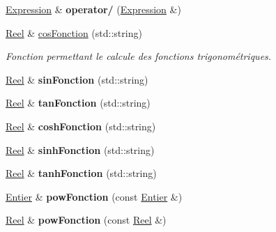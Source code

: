 \begin{DoxyCompactItemize}
\item 
\hypertarget{class_entier_a4ac1f3d23dbd05c895da17659ac32674}{\hyperlink{class_expression}{Expression} \& {\bfseries operator/} (\hyperlink{class_expression}{Expression} \&)}\label{class_entier_a4ac1f3d23dbd05c895da17659ac32674}

\item 
\hyperlink{class_reel}{Reel} \& \hyperlink{class_entier_af49382e55f1a6c4d35472937eb4e8493}{cos\-Fonction} (std\-::string)
\begin{DoxyCompactList}\small\item\em Fonction permettant le calcule des fonctions trigonométriques. \end{DoxyCompactList}\item 
\hypertarget{class_entier_a9a76bc95371915ab2597da36388784d0}{\hyperlink{class_reel}{Reel} \& {\bfseries sin\-Fonction} (std\-::string)}\label{class_entier_a9a76bc95371915ab2597da36388784d0}

\item 
\hypertarget{class_entier_add0d2eb1006510355e55a35c9dee62c0}{\hyperlink{class_reel}{Reel} \& {\bfseries tan\-Fonction} (std\-::string)}\label{class_entier_add0d2eb1006510355e55a35c9dee62c0}

\item 
\hypertarget{class_entier_a999ddcf8d256c93975928b755d363e25}{\hyperlink{class_reel}{Reel} \& {\bfseries cosh\-Fonction} (std\-::string)}\label{class_entier_a999ddcf8d256c93975928b755d363e25}

\item 
\hypertarget{class_entier_ad7a8b6a862cb92326e831f31fc2af82a}{\hyperlink{class_reel}{Reel} \& {\bfseries sinh\-Fonction} (std\-::string)}\label{class_entier_ad7a8b6a862cb92326e831f31fc2af82a}

\item 
\hypertarget{class_entier_a1103622ed3f305835891b01a61fd9684}{\hyperlink{class_reel}{Reel} \& {\bfseries tanh\-Fonction} (std\-::string)}\label{class_entier_a1103622ed3f305835891b01a61fd9684}

\item 
\hypertarget{class_entier_aeecadca4b91a9328a59c1a0a8b44d17a}{\hyperlink{class_entier}{Entier} \& {\bfseries pow\-Fonction} (const \hyperlink{class_entier}{Entier} \&)}\label{class_entier_aeecadca4b91a9328a59c1a0a8b44d17a}

\item 
\hypertarget{class_entier_a58569a9dc633790979323cf8dc71efda}{\hyperlink{class_reel}{Reel} \& {\bfseries pow\-Fonction} (const \hyperlink{class_reel}{Reel} \&)}\label{class_entier_a58569a9dc633790979323cf8dc71efda}


\end{DoxyCompactItemize}
